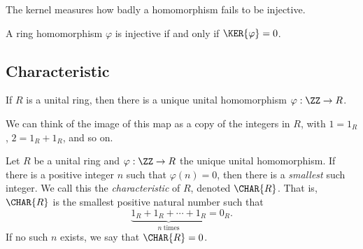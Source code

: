 \documentclass{article}
\begin{document}
\begin{center}
\end{center}

The kernel measures how badly a homomorphism fails to be injective.

\begin{prop}
A ring homomorphism $\varphi$ is injective if and only if $\KER{\varphi} = 0$.
\end{prop}


\subsection*{Characteristic}

\begin{prop}
If $R$ is a unital ring, then there is a unique unital homomorphism $\varphi : \ZZ \rightarrow R$.
\end{prop}

We can think of the image of this map as a copy of the integers in $R$, with $1 = 1_R$, $2 = 1_R + 1_R$, and so on.

\begin{dfn}[Characteristic]
Let $R$ be a unital ring and $\varphi : \ZZ \rightarrow R$ the unique unital homomorphism. If there is a positive integer $n$ such that $\varphi(n) = 0$, then there is a \emph{smallest} such integer. We call this the \emph{characteristic} of $R$, denoted $\CHAR{R}$. That is, $\CHAR{R}$ is the smallest positive natural number such that \[\underbrace{1_R + 1_R + \cdots + 1_R}_{n\ \mathrm{times}} = 0_R.\] If no such $n$ exists, we say that $\CHAR{R} = 0$.
\end{dfn}
\end{document}
